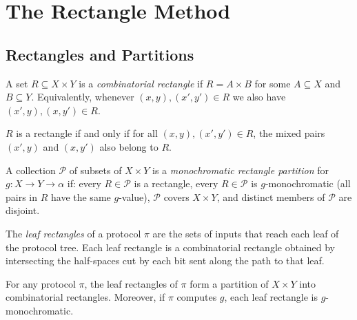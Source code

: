 \chapter{The Rectangle Method}

\section{Rectangles and Partitions}

\begin{definition}[Rectangle]
  \label{def:rectangle}
  \leanok
  A set $R \subseteq X \times Y$ is a \emph{combinatorial rectangle} if
  $R = A \times B$ for some $A \subseteq X$ and $B \subseteq Y$.
  Equivalently, whenever $(x,y),(x',y') \in R$ we also have $(x',y),(x,y') \in R$.
\end{definition}

\begin{lemma}
  \label{lem:rectangle_iff}
  \leanok
  $R$ is a rectangle if and only if for all $(x,y),(x',y') \in R$,
  the mixed pairs $(x',y)$ and $(x,y')$ also belong to $R$.
\end{lemma}

\begin{definition}
  \label{def:mono_rect_partition}
  \leanok
  A collection $\mathcal{P}$ of subsets of $X \times Y$ is a
  \emph{monochromatic rectangle partition} for $g : X \to Y \to \alpha$ if:
  every $R \in \mathcal{P}$ is a rectangle, every $R \in \mathcal{P}$ is
  $g$-monochromatic (all pairs in $R$ have the same $g$-value), $\mathcal{P}$
  covers $X \times Y$, and distinct members of $\mathcal{P}$ are disjoint.
\end{definition}

\begin{definition}
  \label{def:leaf_rectangles}
  \leanok
  The \emph{leaf rectangles} of a protocol $\pi$ are the sets of inputs that
  reach each leaf of the protocol tree.  Each leaf rectangle is a combinatorial
  rectangle obtained by intersecting the half-spaces cut by each bit sent along
  the path to that leaf.
\end{definition}

\begin{lemma}
  \label{lem:leaf_partition}
  \leanok
  For any protocol $\pi$, the leaf rectangles of $\pi$ form a partition of
  $X \times Y$ into combinatorial rectangles.
  Moreover, if $\pi$ computes $g$, each leaf rectangle is $g$-monochromatic.
\end{lemma}

